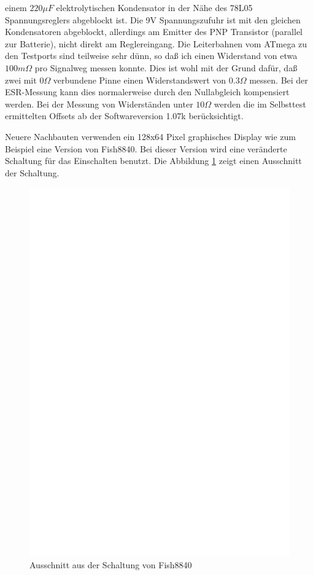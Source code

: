einem \(220\mu F\) elektrolytischen Kondensator in der Nähe des 78L05 Spannungsreglers abgeblockt ist.
Die 9V Spannungszufuhr ist mit den gleichen Kondensatoren abgeblockt, allerdings  am Emitter des PNP Transistor
(parallel zur Batterie), nicht direkt am Reglereingang.
Die Leiterbahnen vom ATmega zu den Testports sind teilweise sehr dünn, so daß ich einen Widerstand
von etwa \(100m \Omega\) pro Signalweg messen konnte. Dies ist wohl mit der Grund dafür, daß zwei
mit \(0 \Omega\) verbundene Pinne einen Widerstandswert von \(0.3 \Omega\) messen.
Bei der ESR-Messung kann dies normalerweise durch den Nullabgleich kompensiert werden.
Bei der Messung von Widerständen unter \(10 \Omega\) werden die im Selbsttest ermittelten Offsets 
ab der Softwareversion 1.07k berücksichtigt.

Neuere Nachbauten verwenden ein 128x64 Pixel graphisches Display wie zum Beispiel eine Version von Fish8840.
Bei dieser Version wird eine veränderte Schaltung für das Einschalten benutzt. Die Abbildung \ref{fig:Fish8840}
zeigt einen Ausschnitt der Schaltung.

\begin{figure}[H]
\centering
\includegraphics[width=12cm]{../FIG/Fish8840.eps}
\caption{Ausschnitt aus der Schaltung von Fish8840}
\label{fig:Fish8840}
\end{figure}

